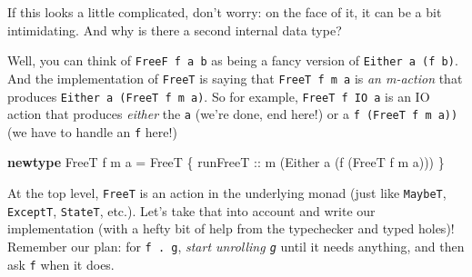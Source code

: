 \documentclass[]{article}
\newenvironment{Shaded}{}{}
\newcommand{\DataTypeTok}[1]{\textcolor[rgb]{0.56,0.13,0.00}{#1}}
\newcommand{\KeywordTok}[1]{\textcolor[rgb]{0.00,0.44,0.13}{\textbf{#1}}}
\newcommand{\NormalTok}[1]{#1}
\newcommand{\OtherTok}[1]{\textcolor[rgb]{0.00,0.44,0.13}{#1}}
\begin{document}
If this looks a little complicated, don't worry: on the face of it, it can be a
bit intimidating. And why is there a second internal data type?

Well, you can think of \texttt{FreeF\ f\ a\ b} as being a fancy version of
\texttt{Either\ a\ (f\ b)}. And the implementation of \texttt{FreeT} is saying
that \texttt{FreeT\ f\ m\ a} is \emph{an m-action} that produces
\texttt{Either\ a\ (FreeT\ f\ m\ a)}. So for example, \texttt{FreeT\ f\ IO\ a}
is an IO action that produces \emph{either} the \texttt{a} (we're done, end
here!) or a \texttt{f\ (FreeT\ f\ m\ a))} (we have to handle an \texttt{f}
here!)

\begin{Shaded}
\begin{Highlighting}[]
\KeywordTok{newtype} \DataTypeTok{FreeT}\NormalTok{ f m a }\OtherTok{=} \DataTypeTok{FreeT}
\NormalTok{    \{}\OtherTok{ runFreeT ::}\NormalTok{ m (}\DataTypeTok{Either}\NormalTok{ a (f (}\DataTypeTok{FreeT}\NormalTok{ f m a))) \}}
\end{Highlighting}
\end{Shaded}

At the top level, \texttt{FreeT} is an action in the underlying monad (just like
\texttt{MaybeT}, \texttt{ExceptT}, \texttt{StateT}, etc.). Let's take that into
account and write our implementation (with a hefty bit of help from the
typechecker and typed holes)! Remember our plan: for \texttt{f\ .\textbar{}\ g},
\emph{start unrolling \texttt{g}} until it needs anything, and then ask
\texttt{f} when it does.
\end{document}
